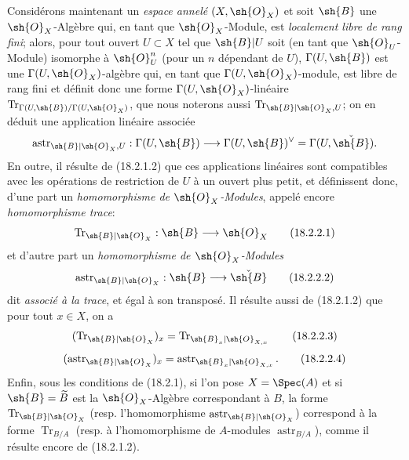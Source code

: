 \begin{env}[18.2.2]
\label{IV.18.2.2}
Considérons maintenant un \emph{espace annelé} $(X,\sh{O}_X)$ et soit $\sh{B}$ une $\sh{O}_X$-Algèbre qui, en tant que $\sh{O}_X$-Module, est \emph{localement libre de rang fini}; alors, pour tout ouvert $U\subset X$ tel que $\sh{B}|U$ soit (en tant que $\sh{O}_U$-Module) isomorphe à $\sh{O}_U^n$ (pour un $n$ dépendant de $U$), $\Gamma(U,\sh{B})$ est une $\Gamma(U,\sh{O}_X)$-algèbre qui, en tant que $\Gamma(U,\sh{O}_X)$-module, est libre de rang fini et définit donc une forme $\Gamma(U,\sh{O}_X)$-linéaire $\operatorname{Tr}_{\Gamma(U,\sh{B})/\Gamma(U,\sh{O}_X)}$, que nous noterons aussi $\operatorname{Tr}_{\sh{B}|\sh{O}_X,U}$; on en déduit une application linéaire associée
\[
  \operatorname{astr}_{\sh{B}|\sh{O}_X,U}:\Gamma(U,\sh{B})\longrightarrow\Gamma(U,\sh{B})^\vee=\Gamma(U,\check{\sh{B}}).
\]
En outre, il résulte de (18.2.1.2) que ces applications linéaires sont compatibles avec les opérations de restriction de $U$ à un ouvert plus petit, et définissent donc, d'une part un \emph{homomorphisme de $\sh{O}_X$-Modules}, appelé encore \emph{homomorphisme trace}:
\begin{equation}
  \operatorname{Tr}_{\sh{B}|\sh{O}_X}:\sh{B}\longrightarrow\sh{O}_X
  \tag{18.2.2.1}\label{IV.18.2.2.1}
\end{equation}
et d'autre part un \emph{homomorphisme de $\sh{O}_X$-Modules}
\begin{equation}
  \operatorname{astr}_{\sh{B}|\sh{O}_X}:\sh{B}\longrightarrow\check{\sh{B}}
  \tag{18.2.2.2}\label{IV.18.2.2.2}
\end{equation}
dit \emph{associé à la trace}, et égal à son transposé. Il résulte aussi de (18.2.1.2) que pour tout $x\in X$, on a
\begin{equation}
  (\operatorname{Tr}_{\sh{B}|\sh{O}_X})_x=\operatorname{Tr}_{\sh{B}_x|\sh{O}_{X,x}}
  \tag{18.2.2.3}\label{IV.18.2.2.3}
\end{equation}
\begin{equation}
  (\operatorname{astr}_{\sh{B}|\sh{O}_X})_x=\operatorname{astr}_{\sh{B}_x|\sh{O}_{X,x}}.
  \tag{18.2.2.4}\label{IV.18.2.2.4}
\end{equation}
Enfin, sous les conditions de (18.2.1), si l'on pose $X=\Spec(A)$ et si $\sh{B}=\widetilde B$ est la $\sh{O}_X$-Algèbre correspondant à $B$, la forme $\operatorname{Tr}_{\sh{B}|\sh{O}_X}$ (resp. l'homomorphisme $\operatorname{astr}_{\sh{B}|\sh{O}_X}$) correspond à la forme $\operatorname{Tr}_{B/A}$ (resp. à l'homomorphisme de $A$-modules $\operatorname{astr}_{B/A}$), comme il résulte encore de (18.2.1.2).
\end{env}


